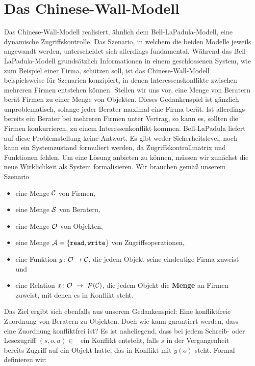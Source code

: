 \section{Das Chinese-Wall-Modell}
Das Chinese-Wall-Modell realisiert, ähnlich dem Bell-LaPadula-Modell, eine dynamische Zugriffskontrolle. Das Szenario, in welchem die beiden Modelle jeweils angewandt werden, unterscheidet sich allerdings fundamental.
Während das Bell-LaPadula-Modell grundsätzlich Informationen in einem geschlossenen System, wie zum Beispiel einer Firma, schützen soll, ist das Chinese-Wall-Modell beispielsweise für Szenarien konzipiert, in denen Interessenskonflikte zwischen mehreren Firmen entstehen können.
Stellen wir uns vor, eine Menge von Beratern berät Firmen zu einer Menge von Objekten. Dieses Gedankenspiel ist gänzlich unproblematisch, solange jeder Berater maximal eine Firma berät. Ist allerdings bereits ein Berater bei mehreren Firmen unter Vertrag, so kann es, sollten die Firmen konkurrieren, zu einem Interessenkonflikt kommen. Bell-LaPadula liefert auf diese Problemstellung keine Antwort. Es gibt weder Sicherheitslevel, noch kann ein Systemzustand formuliert werden, da Zugriffskontrollmatrix und Funktionen fehlen.
Um eine Lösung anbieten zu können, müssen wir zunächst die neue Wirklichkeit als System formalisieren. Wir brauchen gemäß unserem Szenario

\begin{itemize}
	\item eine Menge $\mathcal{C}$ von Firmen,
	\item eine Menge $\mathcal{S}$ von Beratern,
	\item eine Menge $\mathcal{O}$ von Objekten,
	\item eine Menge $\mathcal{A} = \{\texttt{read}, \texttt{write}\}$ von Zugriffsoperationen, 
	\item eine Funktion $y\colon \mathcal{O} \rightarrow \mathcal{C}$, die jedem Objekt seine eindeutige Firma zuweist und
	\item eine Relation $x\colon \calO\ \rArrow\ \calP(\calC)$, die jedem Objekt die \textbf{Menge} an Firmen zuweist, mit denen es in Konflikt steht.
\end{itemize}

Das Ziel ergibt sich ebenfalls aus unserem Gedankenspiel: Eine konfliktfreie Zuordnung von Beratern zu Objekten. Doch wie kann garantiert werden, dass eine Zuordnung konfliktfrei ist? %
Es ist naheliegend, dass bei jedem Schreib- oder Lesezugriff \((s, o, a) \in\) \calS \ctsProd \calO \ctsProd \calA\ ein Konflikt entsteht, falls \(s\) in der Vergangenheit bereits Zugriff auf ein Objekt hatte, das in Konflikt mit \(y(o)\) steht. Formal definieren wir: 

